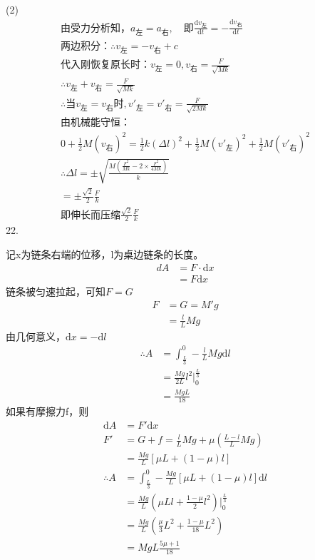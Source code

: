 \documentclass[a4paper,fleqn,twocolumn]{article}
\newcommand{\di}[1]{\mathrm{d}#1}
\newcommand{\dy}[2]{\frac{\di{#1}}{\di{#2}}}
\begin{document}
   		(2)
   		\begin{gather*}
   			\text{由受力分析知，}a_{\text{左}}=a_{\text{右}},\quad\text{即}\dy{v_{\text{左}}}{t}=-\dy{v_{\text{右}}}{t}\\
   			\text{两边积分：}\therefore v_{\text{左}}=-v_{\text{右}}+c\\
   			\text{代入刚恢复原长时：}v_{\text{左}}=0,v_{\text{右}}=\frac{F}{\sqrt{Mk}}\\
   			\therefore v_{\text{左}}+v_{\text{右}}=\frac{F}{\sqrt{Mk}}\\
   			\therefore\text{当}v_{\text{左}}=v_{\text{右}}\text{时},v'_{\text{左}}=v'_{\text{右}}=\frac{F}{\sqrt{2Mk}}\\
   			\text{由机械能守恒：}\\
   			0+\frac{1}{2}M(v_{\text{右}})^2=\frac{1}{2}k(\Delta l)^2+\frac{1}{2}M(v'_{\text{左}})^2+\frac{1}{2}M(v'_{\text{右}})^2\\
   			\therefore\Delta l=\pm\sqrt{\frac{M\left(\frac{F^2}{Mk}-2\times\frac{F^2}{4Mk}\right)}{k}}\\
   			=\pm\frac{\sqrt{2}}{2}\frac{F}{k}\\
   			\text{即伸长而压缩}\frac{\sqrt{2}}{2}\frac{F}{k}
   		\end{gather*}
   		22.\par 
   			记x为链条右端的位移，l为桌边链条的长度。
   			\begin{align*}
   				dA	&=F\cdot\di{x}\\
   					&=F\di{x}
   			\end{align*}
   			链条被匀速拉起，可知$F=G$
   			\begin{align*}
   				F	&=G=M'g\\
   					&=\frac{l}{L}Mg
   			\end{align*}
   			由几何意义，$\di{x}=-\di{l}$
   			\begin{align*}
	   			\therefore A&=\int_{\frac{L}{3}}^{0} -\frac{l}{L}Mg\di{l}\\
	   						&=\frac{Mg}{2L}l^2\left.\right|_{0}^{\frac{L}{3}}\\
	   						&=\frac{MgL}{18}
   			\end{align*}
   			如果有摩擦力f，则
   			\begin{align*}
	   			\di{A}	&=F'\di{x}\\
	   			F'		&=G+f=\frac{l}{L}Mg+\mu\left(\frac{L-l}{L}Mg\right)\\
	   					&=\frac{Mg}{L}[\mu L+(1-\mu)l]\\
	   			\therefore A&=\int_{\frac{L}{3}}^{0} -\frac{Mg}{L}[\mu L+(1-\mu)l] \di{l}\\
	   						&=\frac{Mg}{L}\left(\mu Ll+\frac{1-\mu}{2}l^2\right)\left.\right|_{0}^{\frac{L}{3}}\\
	   						&=\frac{Mg}{L}\left(\frac{\mu}{3}L^2+\frac{1-\mu}{18}L^2\right)\\
	   						&=MgL\frac{5\mu +1}{18}
   			\end{align*}
\end{document}
